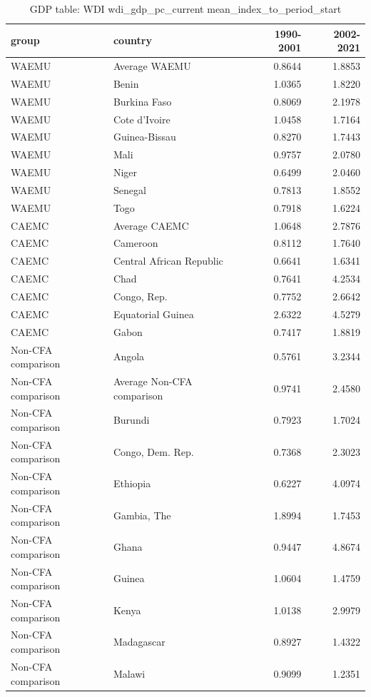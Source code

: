 \begin{table}

\caption{GDP table: WDI wdi_gdp_pc_current mean_index_to_period_start}
\centering
\begin{tabular}[t]{llrr}
\toprule
group & country & 1990-2001 & 2002-2021\\
\midrule
WAEMU & Average WAEMU & 0.8644 & 1.8853\\
WAEMU & Benin & 1.0365 & 1.8220\\
WAEMU & Burkina Faso & 0.8069 & 2.1978\\
WAEMU & Cote d'Ivoire & 1.0458 & 1.7164\\
WAEMU & Guinea-Bissau & 0.8270 & 1.7443\\
\addlinespace
WAEMU & Mali & 0.9757 & 2.0780\\
WAEMU & Niger & 0.6499 & 2.0460\\
WAEMU & Senegal & 0.7813 & 1.8552\\
WAEMU & Togo & 0.7918 & 1.6224\\
CAEMC & Average CAEMC & 1.0648 & 2.7876\\
\addlinespace
CAEMC & Cameroon & 0.8112 & 1.7640\\
CAEMC & Central African Republic & 0.6641 & 1.6341\\
CAEMC & Chad & 0.7641 & 4.2534\\
CAEMC & Congo, Rep. & 0.7752 & 2.6642\\
CAEMC & Equatorial Guinea & 2.6322 & 4.5279\\
\addlinespace
CAEMC & Gabon & 0.7417 & 1.8819\\
Non-CFA comparison & Angola & 0.5761 & 3.2344\\
Non-CFA comparison & Average Non-CFA comparison & 0.9741 & 2.4580\\
Non-CFA comparison & Burundi & 0.7923 & 1.7024\\
Non-CFA comparison & Congo, Dem. Rep. & 0.7368 & 2.3023\\
\addlinespace
Non-CFA comparison & Ethiopia & 0.6227 & 4.0974\\
Non-CFA comparison & Gambia, The & 1.8994 & 1.7453\\
Non-CFA comparison & Ghana & 0.9447 & 4.8674\\
Non-CFA comparison & Guinea & 1.0604 & 1.4759\\
Non-CFA comparison & Kenya & 1.0138 & 2.9979\\
\addlinespace
Non-CFA comparison & Madagascar & 0.8927 & 1.4322\\
Non-CFA comparison & Malawi & 0.9099 & 1.2351\\

\end{tabular}
\end{table}

